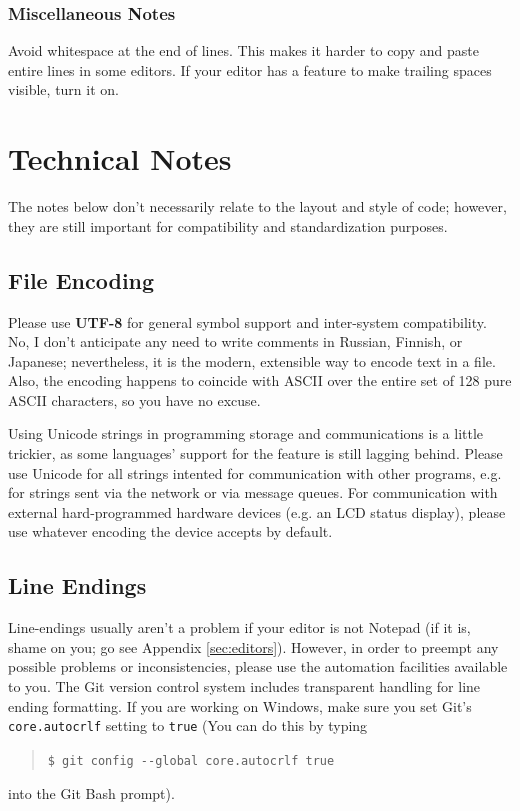 \documentclass[12pt]{article}
\newcommand{\var}[1]{\texttt{#1}}
\newcommand{\commandline}[1]{\begin{quotation}\texttt{\$ #1}\end{quotation}}
\newcommand{\clloption}[1]{-{}-#1}
\newcommand{\textdef}[1]{\textbf{#1}}
\begin{document}
\subsubsection{Miscellaneous Notes}
Avoid whitespace at the end of lines. This makes it harder to copy and paste entire lines in some editors. If your editor has a feature to make trailing spaces visible, turn it on.

\section{Technical Notes}
The notes below don't necessarily relate to the layout and style of code; however, they are still important for compatibility and standardization purposes.
\subsection{File Encoding}
Please use \textdef{UTF-8} for general symbol support and inter-system compatibility. No, I don't anticipate any need to write comments in Russian, Finnish, or Japanese; nevertheless, it is the modern, extensible way to encode text in a file. Also, the encoding happens to coincide with ASCII over the entire set of 128 pure ASCII characters, so you have no excuse.

Using Unicode strings in programming storage and communications is a little trickier, as some languages' support for the feature is still lagging behind. Please use Unicode for all strings intented for communication with other programs, e.g. for strings sent via the network or via message queues. For communication with external hard-programmed hardware devices (e.g. an LCD status display), please use whatever encoding the device accepts by default.

\subsection{Line Endings} Line-endings usually aren't a problem if your editor is not Notepad (if it is, shame on you; go see Appendix \ref{sec:editors}). However, in order to preempt any possible problems or inconsistencies, please use the automation facilities available to you. The Git version control system includes transparent handling for line ending formatting. If you are working on Windows, make sure you set Git's \var{core.autocrlf} setting to \var{true} (You can do this by typing \commandline{git config \clloption{global} core.autocrlf true} into the Git Bash prompt).
\end{document}
